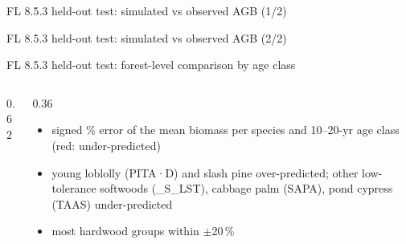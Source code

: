 \begin{frame}{FL 8.5.3 held-out test: simulated vs observed AGB (1/2)}
\begin{center}
\end{center}
\end{frame}

\begin{frame}{FL 8.5.3 held-out test: simulated vs observed AGB (2/2)}
\begin{center}
\end{center}
\end{frame}

\begin{frame}{FL 8.5.3 held-out test: forest-level comparison by age class}
\begin{columns}[T]
\begin{column}{0.62\textwidth}
\end{column}
\begin{column}{0.36\textwidth}
\small
\begin{itemize}\setlength\itemsep{3pt}
\item signed \% error of the mean biomass per species and 10–20-yr age class (red: under-predicted)
\item young loblolly (PITA·D) and slash pine over-predicted; other low-tolerance softwoods (\_S\_LST), cabbage palm (SAPA), pond cypress (TAAS) under-predicted
\item most hardwood groups within $\pm$20\,\%
\end{itemize}
\end{column}
\end{columns}
\end{frame}

